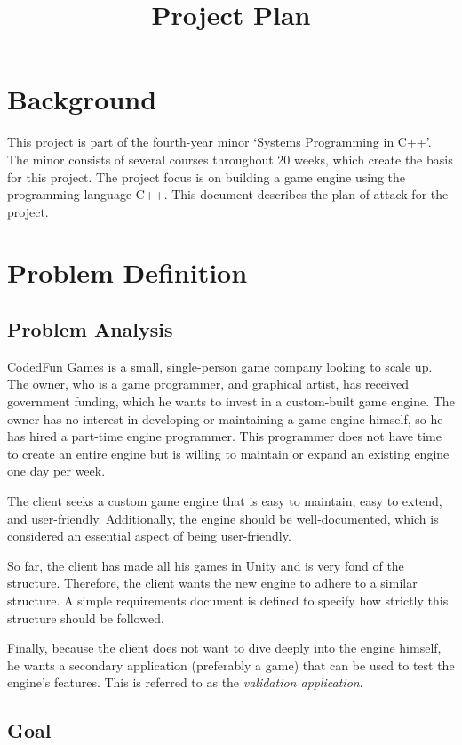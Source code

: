 \documentclass{projdoc}
\title{Project Plan}
\begin{document}
\tablestables
\newpage

\section{Background}

This project is part of the fourth-year minor `Systems Programming in C++'. The minor
consists of several courses throughout 20 weeks, which create the basis for this
project. The project focus is on building a game engine using the programming
language C++. This document describes the plan of attack for the project.

\section{Problem Definition}

\subsection{Problem Analysis}

CodedFun Games is a small, single-person game company looking to scale up. The owner,
who is a game programmer, and graphical artist, has received government funding,
which he wants to invest in a custom-built game engine. The owner has no interest in
developing or maintaining a game engine himself, so he has hired a part-time engine
programmer. This programmer does not have time to create an entire engine but is
willing to maintain or expand an existing engine one day per week.

The client seeks a custom game engine that is easy to maintain, easy to extend, and
user-friendly. Additionally, the engine should be well-documented, which is
considered an essential aspect of being user-friendly.

So far, the client has made all his games in Unity and is very fond of the structure.
Therefore, the client wants the new engine to adhere to a similar structure. A simple
requirements document is defined to specify how strictly this structure should be
followed.

Finally, because the client does not want to dive deeply into the engine himself, he wants a secondary application (preferably a game) that can be used to test the engine's features. This is referred to as the \emph{validation application}.

\subsection{Goal}
\end{document}
